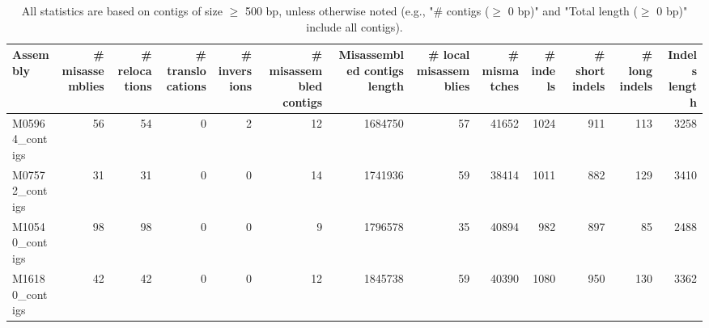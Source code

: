 \documentclass[12pt,a4paper]{article}
\begin{document}
\begin{table}[ht]
\begin{center}
\caption{All statistics are based on contigs of size $\geq$ 500 bp, unless otherwise noted (e.g., "\# contigs ($\geq$ 0 bp)" and "Total length ($\geq$ 0 bp)" include all contigs).}
\begin{tabular}{|l*{12}{|r}|}
\hline
Assembly & \# misassemblies &     \# relocations &     \# translocations &     \# inversions & \# misassembled contigs & Misassembled contigs length & \# local misassemblies & \# mismatches & \# indels &     \# short indels &     \# long indels & Indels length \\ \hline
M05964\_contigs & 56 & 54 & 0 & 2 & 12 & 1684750 & 57 & 41652 & 1024 & 911 & 113 & 3258 \\ \hline
M07572\_contigs & 31 & 31 & 0 & 0 & 14 & 1741936 & 59 & 38414 & 1011 & 882 & 129 & 3410 \\ \hline
M10540\_contigs & 98 & 98 & 0 & 0 & 9 & 1796578 & 35 & 40894 & 982 & 897 & 85 & 2488 \\ \hline
M16180\_contigs & 42 & 42 & 0 & 0 & 12 & 1845738 & 59 & 40390 & 1080 & 950 & 130 & 3362 \\ \hline
\end{tabular}
\end{center}
\end{table}
\end{document}
